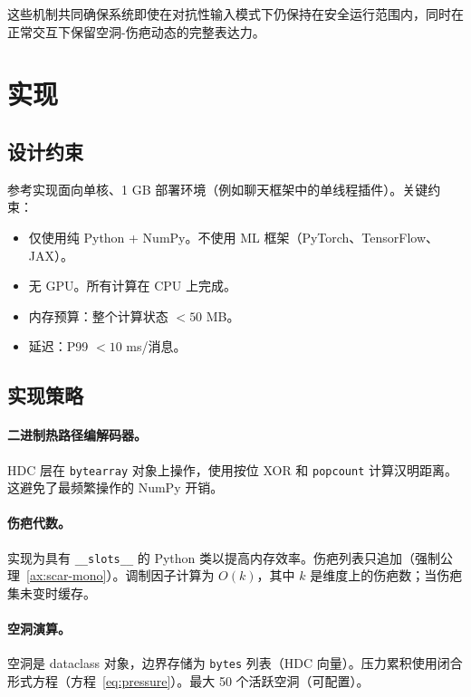 \documentclass[11pt]{article}
\begin{document}
这些机制共同确保系统即使在对抗性输入模式下仍保持在安全运行范围内，同时在正常交互下保留空洞-伤疤动态的完整表达力。

\section{实现}
\label{sec:impl}

\subsection{设计约束}

参考实现面向单核、1 GB 部署环境（例如聊天框架中的单线程插件）。关键约束：
\begin{itemize}
\item 仅使用纯 Python + NumPy。不使用 ML 框架（PyTorch、TensorFlow、JAX）。
\item 无 GPU。所有计算在 CPU 上完成。
\item 内存预算：整个计算状态 $< 50$ MB。
\item 延迟：P99 $< 10$ ms/消息。
\end{itemize}

\subsection{实现策略}

\paragraph{二进制热路径编解码器。}HDC 层在 \texttt{bytearray} 对象上操作，使用按位 XOR 和 \texttt{popcount} 计算汉明距离。这避免了最频繁操作的 NumPy 开销。

\paragraph{伤疤代数。}实现为具有 \texttt{\_\_slots\_\_} 的 Python 类以提高内存效率。伤疤列表只追加（强制公理~\ref{ax:scar-mono}）。调制因子计算为 $O(k)$，其中 $k$ 是维度上的伤疤数；当伤疤集未变时缓存。

\paragraph{空洞演算。}空洞是 dataclass 对象，边界存储为 \texttt{bytes} 列表（HDC 向量）。压力累积使用闭合形式方程（方程~\ref{eq:pressure}）。最大 50 个活跃空洞（可配置）。
\end{document}
